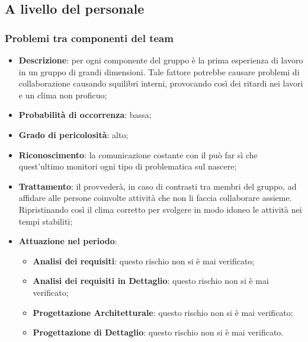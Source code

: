 	\subsection{A livello del personale}
	
		\subsubsection{Problemi tra componenti del team}
		\begin{itemize}
			\item \textbf{Descrizione}: per ogni componente del gruppo è la prima esperienza di lavoro in un gruppo di grandi dimensioni. Tale fattore potrebbe causare problemi di collaborazione causando squilibri interni, provocando così dei ritardi nei lavori e un clima non proficuo; 
			\item \textbf{Probabilità di occorrenza}: bassa;
			\item \textbf{Grado di pericolosità}: alto;
			\item \textbf{Riconoscimento}: la comunicazione costante con il \textit{\Res} può far sì che quest'ultimo monitori ogni tipo di problematica sul nascere;  
			\item \textbf{Trattamento}: il \textit{\Res} provvederà, in caso di contrasti tra membri del gruppo, ad affidare alle persone coinvolte attività che non li faccia collaborare assieme. Ripristinando così il clima corretto per svolgere in modo idoneo le attività nei tempi stabiliti;
			\item \textbf{Attuazione nel periodo}:
			\begin{itemize}
				\item \textbf{Analisi dei requisiti}: questo rischio non si è mai verificato;
				\item \textbf{Analisi dei requisiti in Dettaglio}: questo rischio non si è mai verificato;
				\item \textbf{Progettazione Architetturale}: questo rischio non si è mai verificato;
				\item \textbf{Progettazione di Dettaglio}: questo rischio non si è mai verificato. 
			\end{itemize}
		\end{itemize}
		
